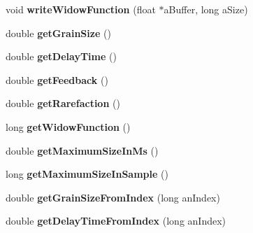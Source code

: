 \begin{DoxyCompactItemize}
\item 
\hypertarget{class_ambisonics_grain_a45a846ece8fbb5342bc698c7e1c3b495}{void {\bfseries write\-Widow\-Function} (float $\ast$a\-Buffer, long a\-Size)}\label{class_ambisonics_grain_a45a846ece8fbb5342bc698c7e1c3b495}

\item 
\hypertarget{class_ambisonics_grain_a4450e21a63926df7d6048f20b48edf3e}{double {\bfseries get\-Grain\-Size} ()}\label{class_ambisonics_grain_a4450e21a63926df7d6048f20b48edf3e}

\item 
\hypertarget{class_ambisonics_grain_a1300da97a4f1efbc0f04b9bc2df8e2d3}{double {\bfseries get\-Delay\-Time} ()}\label{class_ambisonics_grain_a1300da97a4f1efbc0f04b9bc2df8e2d3}

\item 
\hypertarget{class_ambisonics_grain_aa38e471a58c92c69421cb6fa67247993}{double {\bfseries get\-Feedback} ()}\label{class_ambisonics_grain_aa38e471a58c92c69421cb6fa67247993}

\item 
\hypertarget{class_ambisonics_grain_a9aeff58c7ca56686fa622db3c40c8d58}{double {\bfseries get\-Rarefaction} ()}\label{class_ambisonics_grain_a9aeff58c7ca56686fa622db3c40c8d58}

\item 
\hypertarget{class_ambisonics_grain_a9bc4369b64fefafe76f171e19be3698f}{long {\bfseries get\-Widow\-Function} ()}\label{class_ambisonics_grain_a9bc4369b64fefafe76f171e19be3698f}

\item 
\hypertarget{class_ambisonics_grain_a793c40b1b20ee56b72b37369d2b0d539}{double {\bfseries get\-Maximum\-Size\-In\-Ms} ()}\label{class_ambisonics_grain_a793c40b1b20ee56b72b37369d2b0d539}

\item 
\hypertarget{class_ambisonics_grain_ae0389879408414b9a9d2e37a6055e674}{long {\bfseries get\-Maximum\-Size\-In\-Sample} ()}\label{class_ambisonics_grain_ae0389879408414b9a9d2e37a6055e674}

\item 
\hypertarget{class_ambisonics_grain_a5715f3a74d2dba8258d2cdb3663db62c}{double {\bfseries get\-Grain\-Size\-From\-Index} (long an\-Index)}\label{class_ambisonics_grain_a5715f3a74d2dba8258d2cdb3663db62c}

\item 
\hypertarget{class_ambisonics_grain_ab959c7d1cb1a0e27ecb7463a0b4740a6}{double {\bfseries get\-Delay\-Time\-From\-Index} (long an\-Index)}\label{class_ambisonics_grain_ab959c7d1cb1a0e27ecb7463a0b4740a6}


\end{DoxyCompactItemize}
